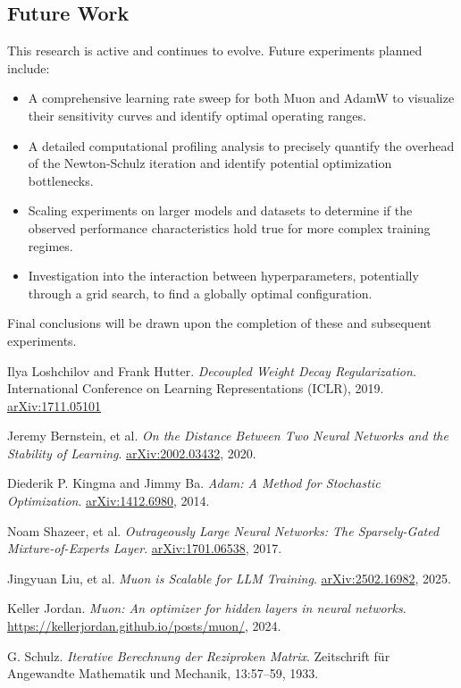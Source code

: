 \documentclass[11pt, a4paper]{article}
\begin{document}
\subsection{Future Work}
This research is active and continues to evolve. Future experiments planned include:
\begin{itemize}
    \item A comprehensive learning rate sweep for both Muon and AdamW to visualize their sensitivity curves and identify optimal operating ranges.
    \item A detailed computational profiling analysis to precisely quantify the overhead of the Newton-Schulz iteration and identify potential optimization bottlenecks.
    \item Scaling experiments on larger models and datasets to determine if the observed performance characteristics hold true for more complex training regimes.
    \item Investigation into the interaction between hyperparameters, potentially through a grid search, to find a globally optimal configuration.
\end{itemize}
Final conclusions will be drawn upon the completion of these and subsequent experiments.

\begin{thebibliography}{9}

    Ilya Loshchilov and Frank Hutter.
    \textit{Decoupled Weight Decay Regularization}.
    International Conference on Learning Representations (ICLR), 2019.  
    \href{https://arxiv.org/abs/1711.05101}{arXiv:1711.05101}
    
    Jeremy Bernstein, et al.
    \textit{On the Distance Between Two Neural Networks and the Stability of Learning}.  
    \href{https://arxiv.org/abs/2002.03432}{arXiv:2002.03432}, 2020.
    
    Diederik P. Kingma and Jimmy Ba.  
    \textit{Adam: A Method for Stochastic Optimization}.  
    \href{https://arxiv.org/abs/1412.6980}{arXiv:1412.6980}, 2014.
    
    Noam Shazeer, et al.  
    \textit{Outrageously Large Neural Networks: The Sparsely-Gated Mixture-of-Experts Layer}.  
    \href{https://arxiv.org/abs/1701.06538}{arXiv:1701.06538}, 2017.
    
    Jingyuan Liu, et al.  
    \textit{Muon is Scalable for LLM Training}.  
    \href{https://arxiv.org/abs/2502.16982}{arXiv:2502.16982}, 2025.
    
    Keller Jordan.  
    \textit{Muon: An optimizer for hidden layers in neural networks}.  
    \url{https://kellerjordan.github.io/posts/muon/}, 2024.
    
    G. Schulz.  
    \textit{Iterative Berechnung der Reziproken Matrix}.  
    Zeitschrift für Angewandte Mathematik und Mechanik, 13:57–59, 1933.
    
    \end{thebibliography}
    
\end{document}

